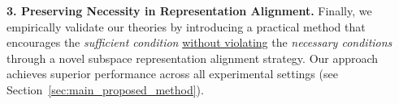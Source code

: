 \textbf{3. Preserving Necessity in Representation Alignment.} Finally, we empirically validate our theories by introducing a practical method that encourages the \textit{sufficient condition} \underline{without violating} the \textit{necessary conditions} through a novel subspace representation alignment strategy. Our approach achieves superior performance across all experimental settings (see Section~\ref{sec:main_proposed_method}).



